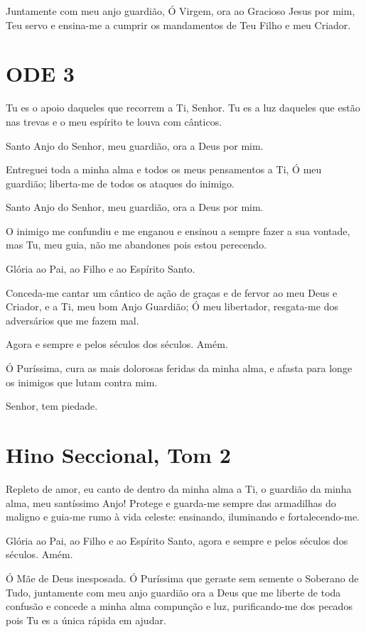\documentclass{subfiles}
\begin{document}
Juntamente com meu anjo guardião, Ó Virgem, ora ao Gracioso Jesus
por mim, Teu servo e ensina-me a cumprir os mandamentos de Teu Filho e
meu Criador.

\section*{ODE 3}

\eirmos{}Tu es o apoio daqueles que recorrem a Ti, Senhor. Tu es a luz daqueles
que estão nas trevas e o meu espírito te louva com cânticos.

Santo Anjo do Senhor, meu guardião, ora a Deus por mim.

Entreguei toda a minha alma e todos os meus pensamentos a Ti, Ó
meu guardião; liberta-me de todos os ataques do inimigo.

Santo Anjo do Senhor, meu guardião, ora a Deus por mim.

O inimigo me confundiu e me enganou e ensinou a sempre fazer a sua
vontade, mas Tu, meu guia, não me abandones pois estou perecendo.

Glória ao Pai, ao Filho e ao Espírito Santo.

Conceda-me cantar um cântico de ação de graças e de fervor ao meu
Deus e Criador, e a Ti, meu bom Anjo Guardião; Ó meu libertador, resgata-me
dos adversários que me fazem mal.

Agora e sempre e pelos séculos dos séculos. Amém.

Ó Puríssima, cura as mais dolorosas feridas da minha alma, e afasta
para longe os inimigos que lutam contra mim.

Senhor, tem piedade. 

\section*{Hino Seccional, Tom 2}

Repleto de amor, eu canto de dentro da minha alma a Ti, o guardião da minha
alma, meu santíssimo Anjo! Protege e guarda-me sempre das armadilhas do maligno
e guia-me rumo à vida celeste: ensinando, iluminando e fortalecendo-me.

Glória ao Pai, ao Filho e ao Espírito Santo, agora e sempre e pelos séculos dos
séculos. Amém.

\theotokion{}Ó Mãe de Deus inesposada. Ó Puríssima que geraste sem
semente o Soberano de Tudo, juntamente com meu anjo guardião ora a Deus
que me liberte de toda confusão e concede a minha alma compunção e luz,
purificando-me dos pecados pois Tu es a única rápida em ajudar.
\end{document}
